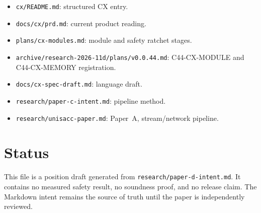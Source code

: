 \documentclass[11pt]{article}
\begin{document}
\begin{itemize}
\item \texttt{cx/README.md}: structured CX entry.
\item \texttt{docs/cx/prd.md}: current product reading.
\item \texttt{plans/cx-modules.md}: module and safety ratchet stages.
\item \texttt{archive/research-2026-11d/plans/v0.0.44.md}: C44-CX-MODULE and C44-CX-MEMORY registration.
\item \texttt{docs/cx-spec-draft.md}: language draft.
\item \texttt{research/paper-c-intent.md}: pipeline method.
\item \texttt{research/unisacc-paper.md}: Paper~A, stream/network pipeline.
\end{itemize}

\section*{Status}

This file is a position draft generated from
\texttt{research/paper-d-intent.md}. It contains no measured safety result, no
soundness proof, and no release claim. The Markdown intent remains the source of
truth until the paper is independently reviewed.
\end{document}
